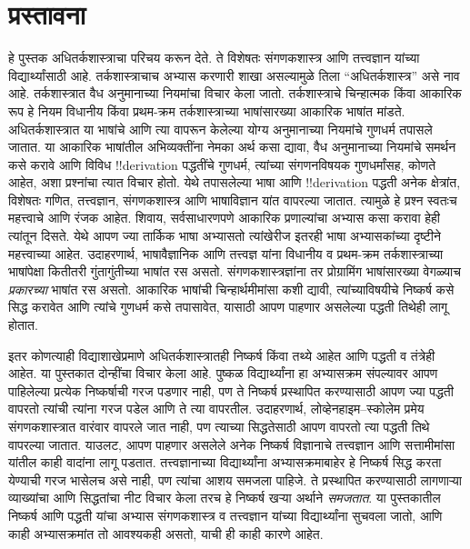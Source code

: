 \chapter{प्रस्तावना}

हे पुस्तक अधितर्कशास्त्राचा परिचय करून देते. ते विशेषतः संगणकशास्त्र आणि तत्त्वज्ञान यांच्या विद्यार्थ्यांसाठी आहे. तर्कशास्त्राचाच अभ्यास करणारी शाखा असल्यामुळे तिला ``अधितर्कशास्त्र'' असे नाव आहे. तर्कशास्त्रात वैध अनुमानाच्या नियमांचा विचार केला जातो. तर्कशास्त्राचे चिन्हात्मक किंवा आकारिक रूप हे नियम विधानीय किंवा प्रथम-क्रम तर्कशास्त्राच्या भाषांसारख्या आकारिक भाषांत मांडते. अधितर्कशास्त्रात या भाषांचे आणि त्या वापरून केलेल्या योग्य अनुमानाच्या नियमांचे गुणधर्म तपासले जातात. या आकारिक भाषांतील अभिव्यक्तींना नेमका अर्थ कसा द्यावा, वैध अनुमानाच्या नियमांचे समर्थन कसे करावे आणि विविध !!{derivation} पद्धतींचे गुणधर्म, त्यांच्या संगणनविषयक गुणधर्मांसह, कोणते आहेत, अशा प्रश्नांचा त्यात विचार होतो. येथे तपासलेल्या भाषा आणि !!{derivation} पद्धती अनेक क्षेत्रांत, विशेषतः गणित, तत्त्वज्ञान, संगणकशास्त्र आणि भाषाविज्ञान यांत वापरल्या जातात. त्यामुळे हे प्रश्न स्वतःच महत्त्वाचे आणि रंजक आहेत. शिवाय, सर्वसाधारणपणे आकारिक प्रणाल्यांचा अभ्यास कसा करावा हेही त्यांतून दिसते. येथे आपण ज्या तार्किक भाषा अभ्यासतो त्यांखेरीज इतरही भाषा अभ्यासकांच्या दृष्टीने महत्त्वाच्या आहेत. उदाहरणार्थ, भाषावैज्ञानिक आणि तत्त्वज्ञ यांना विधानीय व प्रथम-क्रम तर्कशास्त्राच्या भाषांपेक्षा कितीतरी गुंतागुंतीच्या भाषांत रस असतो. संगणकशास्त्रज्ञांना तर प्रोग्रामिंग भाषांसारख्या वेगळ्याच \emph{प्रकारच्या} भाषांत रस असतो. आकारिक भाषांची चिन्हार्थमीमांसा कशी द्यावी, त्यांच्याविषयीचे निष्कर्ष कसे सिद्ध करावेत आणि त्यांचे गुणधर्म कसे तपासावेत, यासाठी आपण पाहणार असलेल्या पद्धती तिथेही लागू होतात.

इतर कोणत्याही विद्याशाखेप्रमाणे अधितर्कशास्त्रातही निष्कर्ष किंवा तथ्ये आहेत आणि पद्धती व तंत्रेही आहेत. या पुस्तकात दोन्हींचा विचार केला आहे. पुष्कळ विद्यार्थ्यांना हा अभ्यासक्रम संपल्यावर आपण पाहिलेल्या प्रत्येक निष्कर्षाची गरज पडणार नाही, पण ते निष्कर्ष प्रस्थापित करण्यासाठी आपण ज्या पद्धती वापरतो त्यांची त्यांना गरज पडेल आणि ते त्या वापरतील. उदाहरणार्थ, लोव्हेनहाइम--स्कोलेम प्रमेय संगणकशास्त्रात वारंवार वापरले जात नाही, पण त्याच्या सिद्धतेसाठी आपण वापरतो त्या पद्धती तिथे वापरल्या जातात. याउलट, आपण पाहणार असलेले अनेक निष्कर्ष विज्ञानाचे तत्त्वज्ञान आणि सत्तामीमांसा यांतील काही वादांना लागू पडतात. तत्त्वज्ञानाच्या विद्यार्थ्यांना अभ्यासक्रमाबाहेर हे निष्कर्ष सिद्ध करता येण्याची गरज भासेलच असे नाही, पण त्यांचा आशय समजला पाहिजे. ते प्रस्थापित करण्यासाठी लागणाऱ्या व्याख्यांचा आणि सिद्धतांचा नीट विचार केला तरच हे निष्कर्ष खऱ्या अर्थाने \emph{समजतात}. या पुस्तकातील निष्कर्ष आणि पद्धती यांचा अभ्यास संगणकशास्त्र व तत्त्वज्ञान यांच्या विद्यार्थ्यांना सुचवला जातो, आणि काही अभ्यासक्रमांत तो आवश्यकही असतो, याची ही काही कारणे आहेत.

